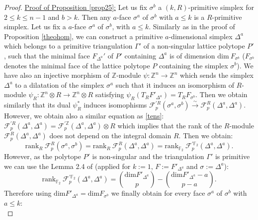 \documentclass{article}
\begin{document}
\begin{proof}
    \underline{Proof of Proposition \ref{prop25}:}
    Let us fix $\sigma^b$ a $(k,R)$-primitive simplex for $2 \leq k \leq n-1$ and $b>k$. Then any $a$-face $\sigma^a$ of $\sigma^b$ with $a\leq k$ is a $R$-primitive simplex. Let us fix a $a$-face $\sigma^a$ of $\sigma^b$, with $a \leq k$. Similarly as in the proof of Proposition \ref{theohom}, we can construct a primitive $a$-dimensional simplex $\Delta^a$ which belongs to a primitive triangulation $\Gamma'$ of a non-singular lattice polytope $P'$, such that the minimal face $F_{\Delta^a}'$ of $P'$ containing $\Delta^a$ is of dimension $\mathrm{dim}~F_{\sigma^b}$ ($F_{\sigma^b}$ denotes the minimal face of the lattice polytope $P$ containing the simplex $\sigma^b$). We have also an injective morphism of $\mathbb{Z}$-module $\psi: \mathbb{Z}^n \rightarrow \mathbb{Z}^n$ which sends the simplex $\Delta^a$ to a dilatation of the simplex $\sigma^a$ such that it induces an isomorphism of $R$-module $\psi_R:\mathbb{Z}^n \otimes R \rightarrow \mathbb{Z}^n \otimes R$ satisfying $\psi_R(T_RF'_{\Delta^a})=T_RF_{\sigma^b}$. Then we obtain similarly that its dual $\psi_R^*$ induces isomophisms $\mathcal{F}^{'R}_p(\sigma^a,\sigma^b)\overset{\sim}{\rightarrow}\mathcal{F}_p^R(\Delta^a,\Delta^a)$. However, we obtain also a similar equation as \ref{tens}: $\mathcal{F}_p^{'R}(\Delta^a,\Delta^a) = \mathcal{F}_p^{'\mathbb{Z}}(\Delta^a,\Delta^a) \otimes R$ which implies that the rank of the $R$-module $\mathcal{F}_p^R(\Delta^a,\Delta^a)$ does not depend on the integral domain $R$. Then we obtain:
    \begin{equation*}
        \mathrm{rank}_R ~\mathcal{F}^R_p(\sigma^a,\sigma^b) = \mathrm{rank}_R ~\mathcal{F}^R_p(\Delta^a,\Delta^a) = \mathrm{rank}_{\mathbb{F}_2}~\mathcal{F}^{'\mathbb{F}_2}_p(\Delta^a,\Delta^a).
    \end{equation*}
    However, as the polytope $P'$ is non-singular and the triangulation $\Gamma'$ is primitive we can use the Lemma 2.4 of \cite{BMR 2024} (applied for $k:=1$, $F:=F'_{\Delta^a}$ and $\sigma:=\Delta^a$):
    \begin{equation*}
        \mathrm{rank}_{\mathbb{F}_2}~\mathcal{F}^{'\mathbb{F}_2}_p(\Delta^a,\Delta^a)=\binom{\mathrm{dim}F'_{\Delta^a}}{p}-\binom{\mathrm{dim}F'_{\Delta^a}-a}{p-a}.
    \end{equation*}
    Therefore using $\mathrm{dim}F'_{\Delta^a}=\mathrm{dim}F_{\sigma^b}$ we finally obtain for every face $\sigma^a$ of $\sigma^b$ with $a\leq k$:
    \begin{equation*}

\end{equation*}
\end{proof}
\end{document}
